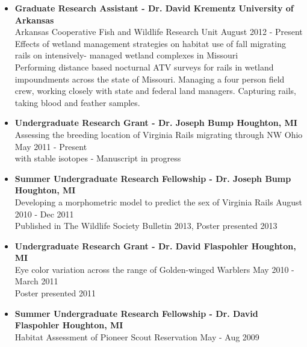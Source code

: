 \documentclass[letterpaper,11pt]{article}
\begin{document}
\begin{itemize}

\item
	{\bf Graduate Research Assistant \normalfont - Dr. David Krementz \hfill \normalfont University of Arkansas}\\
	{\normalfont Arkansas Cooperative Fish and Wildlife Research Unit \hfill \normalfont August 2012 - Present}\\
	{Effects of wetland management strategies on habitat use of fall migrating rails on intensively- managed wetland complexes in Missouri}\\
	{Performing distance based nocturnal ATV surveys for rails in wetland impoundments across the state of Missouri. Managing a four person field crew, working closely with state and federal land managers. Capturing rails, taking blood and feather samples.}
\item
{\bf Undergraduate Research Grant \normalfont - Dr. Joseph Bump \hfill \normalfont Houghton, MI}\\
{\normalfont Assessing the breeding location of Virginia Rails migrating through NW Ohio  \hfill \normalfont May 2011 - Present}\\
{with stable isotopes - Manuscript in progress }
	
\item
	{\bf Summer Undergraduate Research Fellowship \normalfont - Dr. Joseph Bump \hfill \normalfont Houghton, MI}\\
	{\normalfont Developing a morphometric model to predict the sex of Virginia Rails \hfill \normalfont August 2010 - Dec 2011}\\
	{ Published in The Wildlife Society Bulletin 2013, Poster presented 2013}
	
\item
	{\bf Undergraduate Research Grant \normalfont - Dr. David Flaspohler \hfill \normalfont Houghton, MI}\\
	{\normalfont Eye color variation across the range of Golden-winged Warblers \hfill \normalfont May 2010 - March 2011}\\
{Poster presented 2011 }\\
\item
	{\bf Summer Undergraduate Research Fellowship \normalfont - Dr. David Flaspohler \hfill Houghton, MI}\\
	{\normalfont Habitat Assessment of Pioneer Scout Reservation \hfill \normalfont May - Aug 2009}


\end{itemize}
\end{document}

